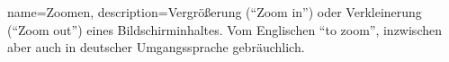 

{
     name=Zoomen,
     description={Vergrößerung ("`Zoom in"') oder Verkleinerung ("`Zoom out"') eines Bildschirminhaltes. Vom Englischen "`to zoom"', inzwischen aber auch in deutscher Umgangssprache gebräuchlich.}
}

